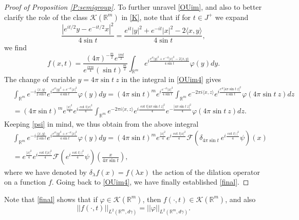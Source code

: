 \documentclass[11pt,a4paper]{amsart}
\def \vf{\varphi}
\newcommand{\Rm}{\mathbb R^m}
\newcommand{\la}{\lambda}
\numberwithin{equation}{section}
\newcommand{\sa}{\langle}
\newcommand{\da}{\rangle}
\numberwithin{equation}{section}
\begin{document}
\begin{proof}[Proof of Proposition \ref{P:semigroup}]
To further unravel \eqref{OUim}, and also to better clarify the role of the class $\mathscr K(\Rm)$ in \eqref{K}, note that if for $t\in J^+$ we expand
\begin{equation}\label{expa}
\frac{|e^{it/2}y-e^{-it/2} x|^2}{4 \sin t} = \frac{e^{it}|y|^2 + e^{-it}|x|^2 - 2\sa x,y\da}{4 \sin t},
\end{equation}
we find 
\begin{equation}\label{OUim4}
f(x,t) = \frac{(4\pi
)^{-\frac{m}{2}}e^{\frac{imt}2}}{e^{\frac{i\pi m}{4}} (\sin t)^{\frac m2}} \int_{\Rm} e^{i \frac{e^{it}|y|^2 + e^{-it}|x|^2 - 2\sa x,y\da}{4 \sin t}} \vf(y) dy.
\end{equation}
The change of variable $y = 4 \pi \sin t\ z$ in the integral in \eqref{OUim4} gives
\begin{align*}
& \int_{\Rm} e^{- i \frac{\sa x,y\da}{2 \sin t}} e^{i \frac{e^{it}|y|^2 + e^{-it}|x|^2}{4 \sin t}} \vf(y) dy = (4 \pi \sin t)^m e^{i \frac{e^{-it}|x|^2}{4 \sin t}} \int_{\Rm} e^{- 2 \pi i \sa x,z\da} e^{i \frac{e^{it}  |4 \pi \sin t\ z|^2}{4 \sin t}} \vf(4 \pi \sin t\ z) dz
\\
& = (4 \pi \sin t)^m e^{\frac{|x|^2}{4}} e^{i \frac{\cot t |x|^2}{4}} \int_{\Rm} e^{- 2 \pi i \sa x,z\da} e^{i \frac{\cot t |4 \pi \sin t\ z|^2}{4}} e^{- \frac{|4 \pi \sin t\ z|^2}{4}} \vf(4 \pi \sin t\ z) dz.
\end{align*}
Keeping \eqref{psi} in mind, 
we thus obtain from the above integral  
\begin{align*}
& \int_{\Rm} e^{- i \frac{\sa x,y\da}{2 \sin t}} e^{i \frac{e^{it}|y|^2 + e^{-it}|x|^2}{4 \sin t}} \vf(y) dy = (4 \pi \sin t)^m e^{\frac{|x|^2}{4}} e^{i \frac{\cot t |x|^2}{4}} \mathscr F\left(\delta_{4 \pi \sin t}\ e^{i \frac{\cot t |\cdot|^2}4} \psi\right)(x)
\\
& = e^{\frac{|x|^2}{4}} e^{i \frac{\cot t |x|^2}{4}} \mathscr F\left(e^{i \frac{\cot t |\cdot|^2}4} \psi\right)(\frac{x}{4 \pi \sin t}),
\end{align*}
where we have denoted by $\delta_\la f(x) = f(\la x)$ the action of the dilation operator on a function $f$.
Going back to \eqref{OUim4}, we have finally established \eqref{final}.

\end{proof}


Note that \eqref{final} shows that if $\vf\in \mathscr K(\Rm)$, then $f(\cdot,t)\in \mathscr K(\Rm)$,  and also
\[
||f(\cdot,t)||_{L^2(\Rm,d\gamma)} = ||\vf||_{L^2(\Rm,d\gamma)}.
\]
\end{document}
